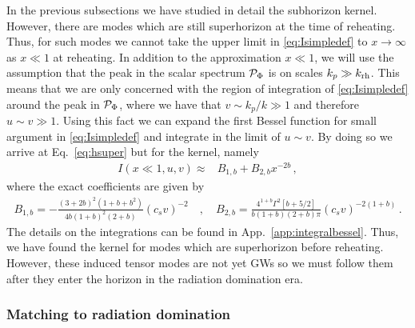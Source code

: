 \documentclass[a4paper,11pt]{article}
\numberwithin{equation}{section}
\begin{document}
In the previous subsections we have studied in detail the subhorizon kernel. However, there are modes which are still superhorizon at the time of reheating. Thus, for such modes we cannot take the upper limit in \eqref{eq:Isimpledef} to $x\to\infty$ as $x\ll1$ at reheating. In addition to the approximation $x\ll1$, we will use the assumption that the peak in the scalar spectrum ${\cal P}_{\Phi}$ is on scales $k_p\gg k_{\rm rh}$. This means that we are only concerned with the region of integration of \eqref{eq:Isimpledef} around the peak in ${\cal P}_{\Phi}$, where we have that $v\sim k_{p}/k\gg1$ and therefore $u\sim v\gg1$. Using this fact we can expand the first Bessel function for small argument in \eqref{eq:Isimpledef} and integrate in the limit of $u\sim v$. By doing so we arrive at Eq.~\eqref{eq:hsuper} but for the kernel, namely
\begin{align}\label{eq:kernelsuperh}
I(x\ll1,u,v)\approx & B_{1,b}+B_{2,b} x^{-2b}\,,
\end{align}
where the exact coefficients are given by
\begin{align}
B_{1,b}=-\frac{(3+2b)^2(1+b+b^2)}{4b(1+b)^2(2+b)}(c_sv)^{-2}\quad ,\quad
B_{2,b}=\frac{4^{1+b}\Gamma^2[b+5/2]}{b(1+b)(2+b)\pi}(c_sv)^{-2(1+b)}\,.
\end{align}
The details on the integrations can be found in App.~\ref{app:integralbessel}. Thus, we have found the kernel for modes which are superhorizon before reheating. However, these induced tensor modes are not yet GWs so we must follow them after they enter the horizon in the radiation domination era.

\subsubsection{Matching to radiation domination}
\end{document}

